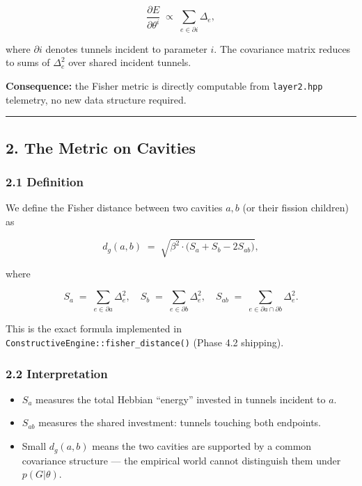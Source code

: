 \documentclass[
  11pt,
  a4paper,
]{article}
\providecommand{\tightlist}{%
  \setlength{\itemsep}{0pt}\setlength{\parskip}{0pt}}
\begin{document}
\[
\frac{\partial E}{\partial \theta^i} \;\propto\; \sum_{e \in \partial i} \Delta_e,
\]

where \(\partial i\) denotes tunnels incident to parameter \(i\). The
covariance matrix reduces to sums of \(\Delta_e^2\) over shared incident
tunnels.

\textbf{Consequence:} the Fisher metric is directly computable from
\texttt{layer2.hpp} telemetry, no new data structure required.

\begin{center}\rule{0.5\linewidth}{0.5pt}\end{center}

\subsection{2. The Metric on Cavities}\label{the-metric-on-cavities}

\subsubsection{2.1 Definition}\label{definition}

We define the Fisher distance between two cavities \(a, b\) (or their
fission children) as

\[
d_g(a, b) \;=\; \sqrt{\beta^2 \cdot \big(S_a + S_b - 2 S_{ab}\big)},
\]

where

\[
S_a \;=\; \sum_{e \in \partial a} \Delta_e^2, \quad
S_b \;=\; \sum_{e \in \partial b} \Delta_e^2, \quad
S_{ab} \;=\; \sum_{e \in \partial a \cap \partial b} \Delta_e^2.
\]

This is the exact formula implemented in
\texttt{ConstructiveEngine::fisher\_distance()} (Phase 4.2 shipping).

\subsubsection{2.2 Interpretation}\label{interpretation}

\begin{itemize}
\tightlist
\item
  \(S_a\) measures the total Hebbian ``energy'' invested in tunnels
  incident to \(a\).
\item
  \(S_{ab}\) measures the shared investment: tunnels touching both
  endpoints.
\item
  Small \(d_g(a, b)\) means the two cavities are supported by a common
  covariance structure --- the empirical world cannot distinguish them
  under \(p(G|\theta)\).
\end{itemize}
\end{document}
